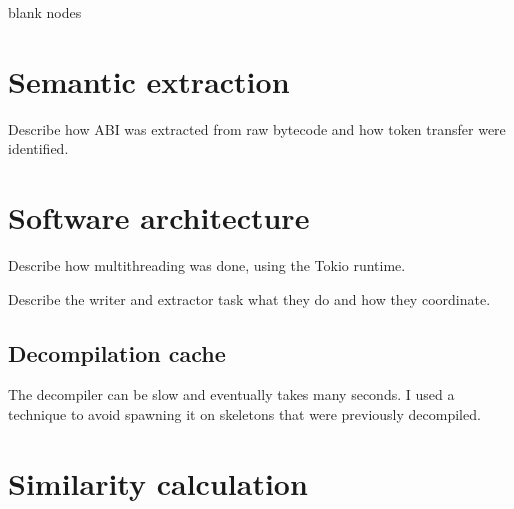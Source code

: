 blank nodes

\section{Semantic extraction}

Describe how ABI was extracted from raw bytecode and how token transfer were identified.

\section{Software architecture}

Describe how multithreading was done, using the Tokio runtime.

Describe the writer and extractor task what they do and how they coordinate.

\subsection{Decompilation cache}

The decompiler can be slow and eventually takes many seconds. I used a technique to avoid spawning it on skeletons that were previously decompiled.

\section{Similarity calculation}





